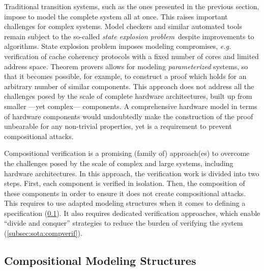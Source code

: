 Traditional transition systems, such as the ones presented in the previous
section, impose to model the complete system all at once.
%
This raises important challenges for complex systems.
%
Model checkers and similar automated tools remain subject to the so-called
\emph{state explosion problem}\,\cite{clarke2012model} despite improvements to
algorithms.
%
State explosion problem imposes modeling compromises, \emph{e.g.}  verification
of cache coherency protocols with a fixed number of cores and limited address
space.
%
Theorem provers allows for modeling \emph{parameterized} systems, so that it
becomes possible, for example, to construct a proof which holds for an arbitrary
number of similar components.
%
This approach does not address all the challenges posed by the scale of complete
hardware architectures, built up from smaller ---yet complex--- components.
%
A comprehensive hardware model in terms of hardware components would undoubtedly
make the construction of the proof unbearable for any non-trivial properties,
yet is a requirement to prevent compositional attacks.

Compositional verification is a promising (family of) approach(es) to overcome
the challenges posed by the scale of complex and large systems, including hardware architectures.
%
In this approach, the verification work is divided into two steps.
%
First, each component is verified in isolation.
%
Then, the composition of these components in order to ensure it does not create
compositional attacks.
%
This requires to use adapted modeling structures when it comes to defining a
specification (\ref{subsec:sota:compmod}).
%
It also requires dedicated verification approaches, which enable ``divide and
conquer'' strategies to reduce the burden of verifying the system
(\ref{subsec:sota:compverif}).

\subsection{Compositional Modeling Structures}
\label{subsec:sota:compmod}

